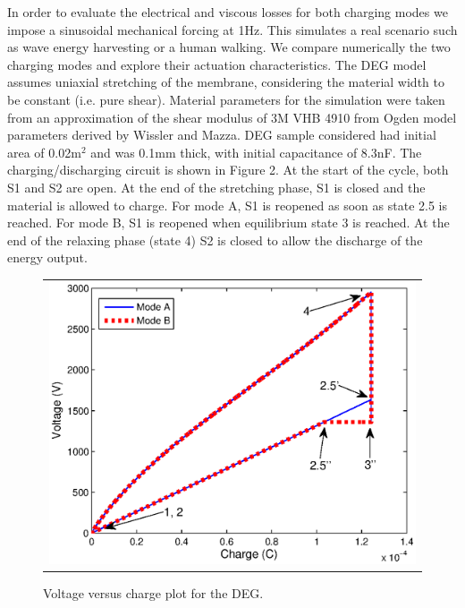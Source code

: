 	In order to evaluate the electrical and viscous losses for both charging modes we impose a sinusoidal mechanical forcing at 1Hz. This simulates a real scenario such as wave energy harvesting or a human walking. We compare numerically the two charging modes and explore their actuation characteristics. The DEG model assumes uniaxial stretching of the membrane, considering the material width to be constant (i.e. pure shear). Material parameters for the simulation were taken from an approximation of the shear modulus of 3M VHB 4910 from Ogden model parameters derived by Wissler and Mazza\cite{RN46}. DEG sample considered had initial area of 0.02m$^2$ and was 0.1mm thick, with initial capacitance of 8.3nF. The charging/discharging circuit is shown in Figure 2. At the start of the cycle, both S1 and S2 are open. At the end of the stretching phase, S1 is closed and the material is allowed to charge.  For mode A, S1 is reopened as soon as state 2.5\textquotesingle{} is reached.  For mode B, S1 is reopened when equilibrium state 3 is reached. At the end of the relaxing phase (state 4) S2 is closed to allow the discharge of the energy output. 
 
   \begin{figure}[h]
   \begin{center}
   \begin{tabular}{c} %
   \includegraphics[scale=0.8]{fig02/Fig3.eps}
   \end{tabular}
   \end{center}
   \caption[example] 
   { \label{fig:Cycle QxV} 
Voltage versus charge plot for the DEG.}
   \end{figure}  
 

